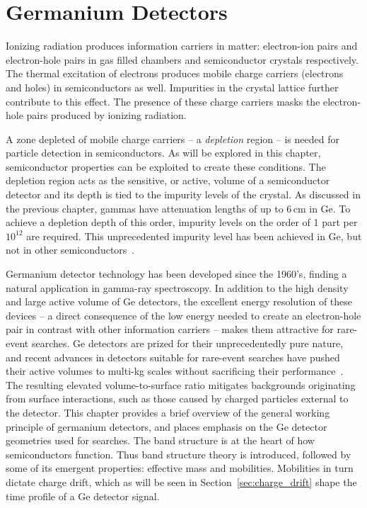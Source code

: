 \chapter{Germanium Detectors}\label{chap:gedet}
Ionizing radiation produces information carriers in matter: electron-ion pairs and electron-hole pairs in gas filled chambers and semiconductor crystals respectively. The thermal excitation of electrons produces mobile charge carriers (electrons and holes) in semiconductors as well. Impurities in the crystal lattice further contribute to this effect. The presence of these charge carriers masks the electron-hole pairs produced by ionizing radiation. 

A zone depleted of mobile charge carriers -- a \textit{depletion} region -- is needed for particle detection in semiconductors. As will be explored in this chapter, semiconductor properties can be exploited to create these conditions. The depletion region acts as the sensitive, or active, volume of a semiconductor detector and its depth is tied to the impurity levels of the crystal. As discussed in the previous chapter, gammas have attenuation lengths of up to 6\,cm in Ge. To achieve a depletion depth of this order, impurity levels on the order of 1 part per $10^{12}$ are required. This unprecedented impurity level has been achieved in Ge, but not in other semiconductors~\cite{knoll}. 

Germanium detector technology has been developed since the 1960's, finding a natural application in gamma-ray spectroscopy. In addition to the high density and large active volume of Ge detectors, the excellent energy resolution of these devices -- a direct consequence of the low energy needed to create an electron-hole pair in contrast with other information carriers -- makes them attractive for rare-event searches. Ge detectors are prized for their unprecedentedly pure nature, and recent advances in detectors suitable for rare-event searches have pushed their active volumes to multi-kg scales without sacrificing their performance~\cite{icpc,icpc_psd}. The resulting elevated volume-to-surface ratio mitigates backgrounds originating from surface interactions, such as those caused by charged particles external to the detector. This chapter provides a brief overview of the general working principle of germanium detectors, and places emphasis on the Ge detector geometries used for \novbb{} searches. The band structure is at the heart of how semiconductors function. Thus band structure theory is introduced, followed by some of its emergent properties: effective mass and mobilities. Mobilities in turn dictate charge drift, which as will be seen in Section~\ref{sec:charge_drift} shape the time profile of a Ge detector signal. 

